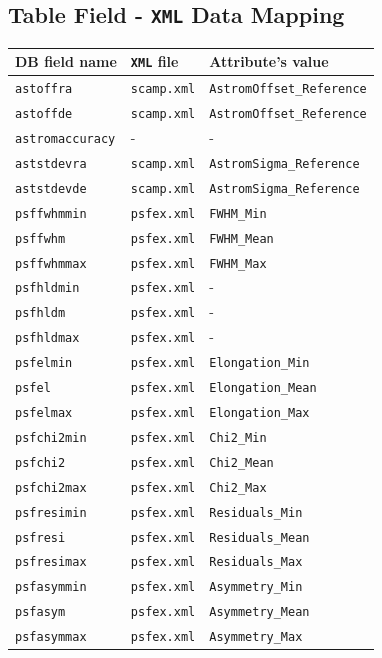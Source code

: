 \documentclass[twoside,a4paper]{article}
\begin{document}
\subsection{Table Field - {\tt XML} Data Mapping}
\begin{table}[!h]
\centering
\footnotesize{
\begin{tabular}{|l|l|l|}
\hline
DB field name & {\tt XML} file & Attribute's value\\
\hline
{\tt astoffra} & {\tt scamp.xml} & {\tt AstromOffset\_Reference}\\
{\tt astoffde} & {\tt scamp.xml} & {\tt AstromOffset\_Reference}\\
{\tt astromaccuracy} & - & -\\
{\tt aststdevra} & {\tt scamp.xml} & {\tt AstromSigma\_Reference}\\
{\tt aststdevde} & {\tt scamp.xml} & {\tt AstromSigma\_Reference}\\
{\tt psffwhmmin} & {\tt psfex.xml} & {\tt FWHM\_Min}\\
{\tt psffwhm} & {\tt psfex.xml} & {\tt FWHM\_Mean}\\
{\tt psffwhmmax} & {\tt psfex.xml} & {\tt FWHM\_Max}\\
{\tt psfhldmin} & {\tt psfex.xml} & -\\
{\tt psfhldm} & {\tt psfex.xml} & -\\
{\tt psfhldmax} & {\tt psfex.xml} & -\\
{\tt psfelmin} & {\tt psfex.xml} & {\tt Elongation\_Min}\\
{\tt psfel} & {\tt psfex.xml} & {\tt Elongation\_Mean}\\
{\tt psfelmax} & {\tt psfex.xml} & {\tt Elongation\_Max}\\
{\tt psfchi2min} & {\tt psfex.xml} & {\tt Chi2\_Min}\\
{\tt psfchi2} & {\tt psfex.xml} & {\tt Chi2\_Mean}\\
{\tt psfchi2max} & {\tt psfex.xml} & {\tt Chi2\_Max}\\
{\tt psfresimin} & {\tt psfex.xml} & {\tt Residuals\_Min}\\
{\tt psfresi} & {\tt psfex.xml} & {\tt Residuals\_Mean}\\
{\tt psfresimax} & {\tt psfex.xml} & {\tt Residuals\_Max}\\
{\tt psfasymmin} & {\tt psfex.xml} & {\tt Asymmetry\_Min}\\
{\tt psfasym} & {\tt psfex.xml} & {\tt Asymmetry\_Mean}\\
{\tt psfasymmax} & {\tt psfex.xml} & {\tt Asymmetry\_Max}\\

\end{tabular}}
\end{table}
\end{document}
